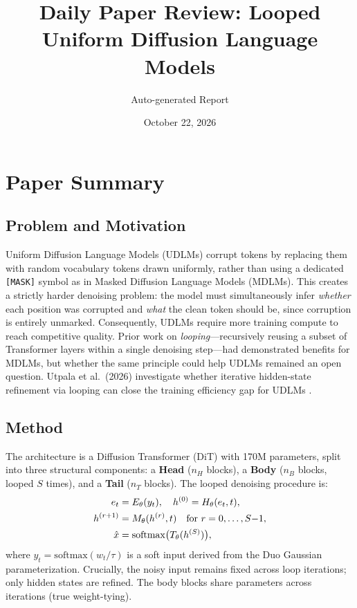 \documentclass[11pt,a4paper]{article}
\title{Daily Paper Review: Looped Uniform Diffusion Language Models}
\author{Auto-generated Report}
\date{October 22, 2026}
\begin{document}
\maketitle

\section{Paper Summary}

\subsection{Problem and Motivation}
Uniform Diffusion Language Models (UDLMs) corrupt tokens by replacing them with random vocabulary tokens drawn uniformly, rather than using a dedicated \texttt{[MASK]} symbol as in Masked Diffusion Language Models (MDLMs). This creates a strictly harder denoising problem: the model must simultaneously infer \emph{whether} each position was corrupted and \emph{what} the clean token should be, since corruption is entirely unmarked. Consequently, UDLMs require more training compute to reach competitive quality. Prior work on \emph{looping}---recursively reusing a subset of Transformer layers within a single denoising step---had demonstrated benefits for MDLMs, but whether the same principle could help UDLMs remained an open question. Utpala et al.\ (2026) investigate whether iterative hidden-state refinement via looping can close the training efficiency gap for UDLMs \cite{utpala2026looped}.

\subsection{Method}
The architecture is a Diffusion Transformer (DiT) with 170M parameters, split into three structural components: a \textbf{Head} ($n_H$ blocks), a \textbf{Body} ($n_B$ blocks, looped $S$ times), and a \textbf{Tail} ($n_T$ blocks). The looped denoising procedure is:
\begin{align}
  e_t &= E_\theta(y_t), \quad h^{(0)} = H_\theta(e_t, t), \notag \\
  h^{(r+1)} &= M_\theta(h^{(r)}, t) \quad \text{for } r = 0, \ldots, S{-}1, \notag \\
  \hat{x} &= \mathrm{softmax}\bigl(T_\theta(h^{(S)})\bigr),
\end{align}
where $y_t = \mathrm{softmax}(w_t / \tau)$ is a soft input derived from the Duo Gaussian parameterization. Crucially, the noisy input remains fixed across loop iterations; only hidden states are refined. The body blocks share parameters across iterations (true weight-tying).
\end{document}
